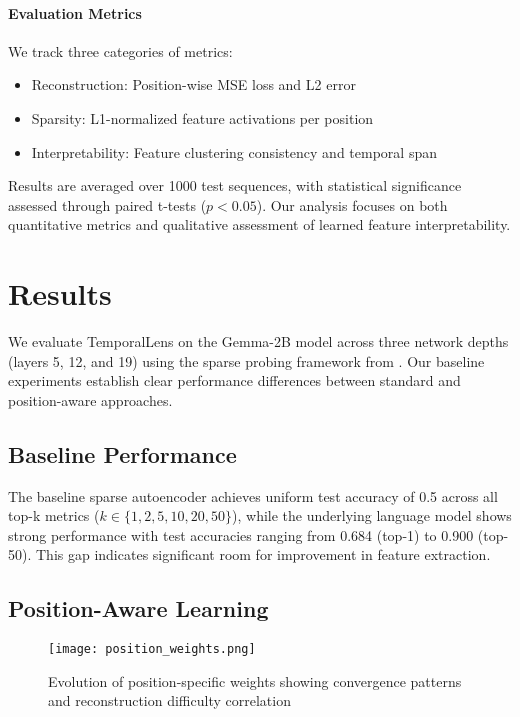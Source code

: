 \documentclass{article} %
\begin{document}
\paragraph{Evaluation Metrics} We track three categories of metrics:
\begin{itemize}
    \item Reconstruction: Position-wise MSE loss and L2 error
    \item Sparsity: L1-normalized feature activations per position
    \item Interpretability: Feature clustering consistency and temporal span
\end{itemize}

Results are averaged over 1000 test sequences, with statistical significance assessed through paired t-tests ($p < 0.05$). Our analysis focuses on both quantitative metrics and qualitative assessment of learned feature interpretability.

\section{Results}
\label{sec:results}

We evaluate TemporalLens on the Gemma-2B model across three network depths (layers 5, 12, and 19) using the sparse probing framework from \cite{Marks2024EnhancingNN}. Our baseline experiments establish clear performance differences between standard and position-aware approaches.

\subsection{Baseline Performance}
The baseline sparse autoencoder achieves uniform test accuracy of 0.5 across all top-k metrics ($k \in \{1,2,5,10,20,50\}$), while the underlying language model shows strong performance with test accuracies ranging from 0.684 (top-1) to 0.900 (top-50). This gap indicates significant room for improvement in feature extraction.

\subsection{Position-Aware Learning}
\begin{figure}[h]
    \centering
    \texttt{[image: position\_weights.png]}
    \caption{Evolution of position-specific weights showing convergence patterns and reconstruction difficulty correlation}
    \label{fig:pos-weights}
\end{figure}
\end{document}
